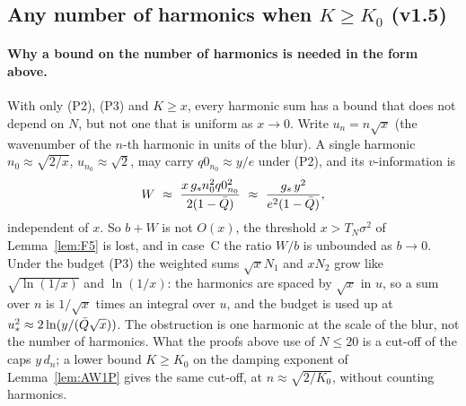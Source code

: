 \subsection*{Any number of harmonics when $K\ge K_0$ (v1.5)}

\paragraph*{Why a bound on the number of harmonics is needed in the form above.} \derivst{}
With only (P2), (P3) and $K\ge x$, every harmonic sum has a bound that does not depend on $N$, but not one that is uniform as $x\to0$. Write
$u_n=n\sqrt x$ (the wavenumber of the $n$-th harmonic in units of the blur). A single harmonic $n_0\approx\sqrt{2/x}$, $u_{n_0}\approx\sqrt2$, may carry
$q0_{n_0}\approx y/e$ under (P2), and its $v$-information is
\begin{equation*}
W\ \approx\ \frac{x\,g_sn_0^2q0_{n_0}^2}{2(1-\Qb)}\ \approx\ \frac{g_s\,y^2}{e^2(1-\Qb)},
\end{equation*}
independent of $x$. So $b+W$ is not $O(x)$, the threshold $x>T_N\sigma^2$ of Lemma~\ref{lem:F5} is lost, and in case~C the ratio $W/b$ is unbounded as $b\to0$.
Under the budget (P3) the weighted sums $\sqrt xN_1$ and $xN_2$ grow like $\sqrt{\ln(1/x)}$ and $\ln(1/x)$: the harmonics are spaced by $\sqrt x$ in $u$, so a
sum over $n$ is $1/\sqrt x$ times an integral over $u$, and the budget is used up at $u_*^2\approx2\ln(y/(\bar Q\sqrt x))$. The obstruction is one harmonic at the
scale of the blur, not the number of harmonics. What the proofs above use of $N\le20$ is a cut-off of the caps $y\,d_n$; a lower bound $K\ge K_0$ on the
damping exponent of Lemma~\ref{lem:AW1P} gives the same cut-off, at $n\approx\sqrt{2/K_0}$, without counting harmonics.

